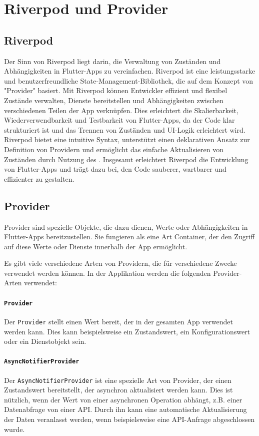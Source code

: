 \documentclass{entwurfsheft}
\begin{document}
\section{Riverpod und Provider}
\label{sec:riverpod}
\subsection{Riverpod}
Der Sinn von Riverpod liegt darin, die Verwaltung von Zuständen und Abhängigkeiten in Flutter-Apps zu vereinfachen. Riverpod ist eine leistungsstarke und benutzerfreundliche State-Management-Bibliothek, die auf dem Konzept von "Provider" basiert. Mit Riverpod können Entwickler effizient und flexibel Zustände verwalten, Dienste bereitstellen und Abhängigkeiten zwischen verschiedenen Teilen der App verknüpfen. Dies erleichtert die Skalierbarkeit, Wiederverwendbarkeit und Testbarkeit von Flutter-Apps, da der Code klar strukturiert ist und das Trennen von Zuständen und UI-Logik erleichtert wird. Riverpod bietet eine intuitive Syntax, unterstützt einen deklarativen Ansatz zur Definition von Providern und ermöglicht das einfache Aktualisieren von Zuständen durch Nutzung des . Insgesamt erleichtert Riverpod die Entwicklung von Flutter-Apps und trägt dazu bei, den Code sauberer, wartbarer und effizienter zu gestalten.
\subsection{Provider}
Provider sind spezielle Objekte, die dazu dienen, Werte oder Abhängigkeiten in Flutter-Apps bereitzustellen. Sie fungieren als eine Art Container, der den Zugriff auf diese Werte oder Dienste innerhalb der App ermöglicht.

Es gibt viele verschiedene Arten von Providern, die für verschiedene Zwecke verwendet werden können. In der Applikation werden die folgenden Provider-Arten verwendet:

\paragraph{\texttt{Provider}}
Der \texttt{Provider} stellt einen Wert bereit, der in der gesamten App verwendet werden kann. Dies kann beispielsweise ein Zustandswert, ein Konfigurationswert oder ein Dienstobjekt sein.

\paragraph{\texttt{AsyncNotifierProvider}}
Der \texttt{AsyncNotifierProvider} ist eine spezielle Art von Provider, der einen Zustandswert bereitstellt, der asynchron aktualisiert werden kann. Dies ist nützlich, wenn der Wert von einer asynchronen Operation abhängt, z.B. einer Datenabfrage von einer API. Durch ihn kann eine automatische Aktualisierung der Daten veranlasst werden, wenn beispielsweise eine API-Anfrage abgeschlossen wurde.
\end{document}
